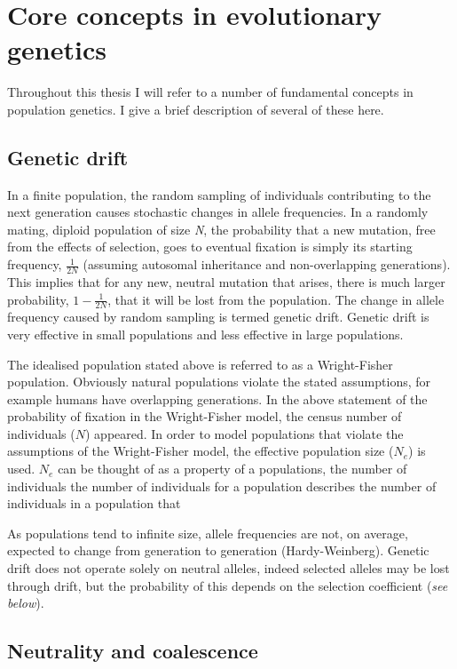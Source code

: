 \section[Core concepts]{Core concepts in evolutionary genetics}

	Throughout this thesis I will refer to a number of fundamental concepts in population genetics. I give a brief description of several of these here.

\subsection{Genetic drift}

	In a finite population, the random sampling of individuals contributing to the next generation causes stochastic changes in allele frequencies. In a randomly mating, diploid population of size \textit{N}, the probability that a new mutation, free from the effects of selection, goes to eventual fixation is simply its starting frequency, $\frac{1}{2N}$ (assuming autosomal inheritance and non-overlapping generations). This implies that for any new, neutral mutation that arises, there is much larger probability, $1 - \frac{1}{2N}$, that it will be lost from the population. The change in allele frequency caused by random sampling is termed genetic drift. Genetic drift is very effective in small populations and less effective in large populations. 
	
	The idealised population stated above is referred to as a Wright-Fisher population. Obviously natural populations violate the stated assumptions, for example humans have overlapping generations. In the above statement of the probability of fixation in the Wright-Fisher model, the census number of individuals ($N$) appeared. In order to model populations that violate the assumptions of the Wright-Fisher model, the effective population size ($N_e$) is used. $N_e$ can be thought of as a property of a populations, the number of individuals the number of individuals for a population describes the number of individuals in a population that 

	As populations tend to infinite size, allele frequencies are not, on average, expected to change from generation to generation (Hardy-Weinberg). Genetic drift does not operate solely on neutral alleles, indeed selected alleles may be lost through drift, but the probability of this depends on the selection coefficient (\textit{see below}).
	
\subsection{Neutrality and coalescence}

